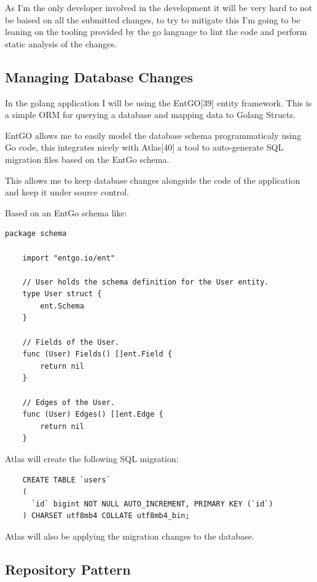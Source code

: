 \documentclass{article}
\begin{document}
  As I'm the only developer involved in the development it will be very hard to not be baised on all the submitted changes, to try to mitigate this I'm going to be leaning on the tooling provided by the go language to lint the code and perform static analysis of the changes.

  \subsection{Managing Database Changes}

  In the golang application I will be using the EntGO[39] entity framework. This is a simple ORM for querying a database and mapping data to Golang Structs.

  EntGO allows me to easily model the database schema programmaticaly using Go code, this integrates nicely with Atlas[40] a tool to auto-generate SQL migration files based on the EntGo schema.

  This allows me to keep database changes alongside the code of the application and keep it under source control.

  Based on an EntGo schema like:

  \begin{lstlisting}[language=Golang]
    package schema

    import "entgo.io/ent"

    // User holds the schema definition for the User entity.
    type User struct {
        ent.Schema
    }

    // Fields of the User.
    func (User) Fields() []ent.Field {
        return nil
    }

    // Edges of the User.
    func (User) Edges() []ent.Edge {
        return nil
    }
  \end{lstlisting}

  Atlas will create the following SQL migration:

  \begin{lstlisting}
    CREATE TABLE `users` 
    (
      `id` bigint NOT NULL AUTO_INCREMENT, PRIMARY KEY (`id`)
    ) CHARSET utf8mb4 COLLATE utf8mb4_bin;
  \end{lstlisting}

  Atlas will also be applying the migration changes to the database.

  \subsection{Repository Pattern}
\end{document}
